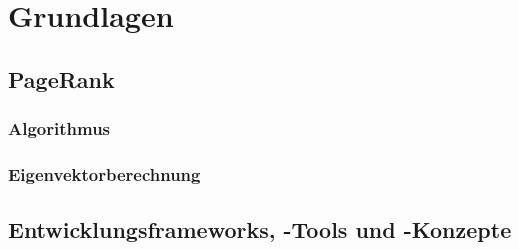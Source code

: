 \section{Grundlagen}
\label{sec:7-grundlagen}

\subsection{PageRank}
\subsubsection{Algorithmus}
\subsubsection{Eigenvektorberechnung}
\subsection{Entwicklungsframeworks, -Tools und -Konzepte}